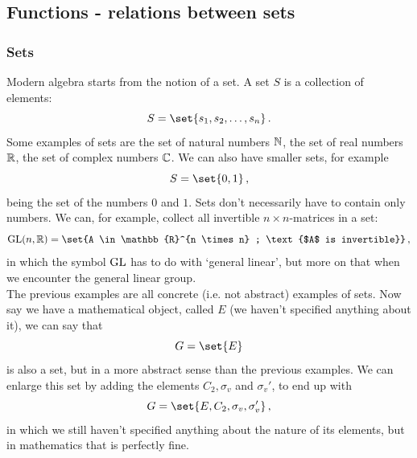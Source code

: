 \subsection{Functions - relations between sets}
    \subsubsection{Sets}
        Modern algebra starts from the notion of a set. A set $S$ is a collection of elements:
        \begin{equation}
            S = \set{s_1, s_2, \dots, s_n} \thinspace .
        \end{equation}
        Some examples of sets are the set of natural numbers $\mathbb{N}$, the set of real numbers $\mathbb{R}$, the set of complex numbers $\mathbb{C}$. We can also have smaller sets, for example
        \begin{equation}
            S = \set{0, 1} \thinspace ,
        \end{equation}
        being the set of the numbers $0$ and $1$. Sets don't necessarily have to contain only numbers. We can, for example, collect all invertible $n \times n$-matrices in a set:
        \begin{equation}
            \GLg(n, \mathbb{R}) = \set{A \in \mathbb{R}^{n \times n} ; \text{$A$ is invertible}} \thinspace ,
        \end{equation}
        in which the symbol $\operatorname{GL}$ has to do with `general linear', but more on that when we encounter the general linear group. \\

        The previous examples are all concrete (i.e. not abstract) examples of sets. Now say we have a mathematical object, called $E$ (we haven't specified anything about it), we can say that
        \begin{equation}
            G = \set{E}
        \end{equation}
        is also a set, but in a more abstract sense than the previous examples. We can enlarge this set by adding the elements $C_2, \sigma_v$ and $\sigma_v'$, to end up with
        \begin{equation}
            G = \set{E, C_2, \sigma_v, \sigma_v'} \thinspace ,
        \end{equation}
        in which we still haven't specified anything about the nature of its elements, but in mathematics that is perfectly fine. \\

